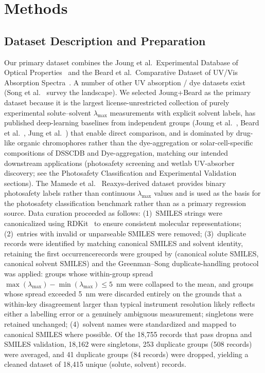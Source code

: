 \documentclass[journal=jcisd8,manuscript=article]{achemso}
\newcommand{\added}[1]{{\color{addedblue}#1}}
\newcommand{\removed}[1]{{\color{removedred}#1}}
\begin{document}
\section{Methods}
\label{sec:methods}

\subsection{Dataset Description and Preparation}
\label{sec:dataset}

Our primary dataset combines the Joung et al.\ Experimental Database of Optical Properties~\cite{joung2020experimental} and the Beard et al.\ Comparative Dataset of UV/Vis Absorption Spectra~\cite{beard2019comparative}.
\added{A number of other UV absorption / dye datasets exist (Song et al.~\cite{song2025fluortools} survey the landscape). We selected Joung+Beard as the primary dataset because it is the largest license-unrestricted collection of purely experimental solute--solvent $\lambda_{\max}$ measurements with explicit solvent labels, has published deep-learning baselines from independent groups (Joung et al.~\cite{joung2021deep}, Beard et al.~\cite{beard2019comparative}, Jung et al.~\cite{jung2024machine}) that enable direct comparison, and is dominated by drug-like organic chromophores rather than the dye-aggregation or solar-cell-specific compositions of DSSCDB and Dye-aggregation, matching our intended downstream applications (photosafety screening and wetlab UV-absorber discovery; see the Photosafety Classification and Experimental Validation sections). The Mamede et al.~\cite{mamede2021machine} Reaxys-derived dataset provides binary photosafety labels rather than continuous $\lambda_{\max}$ values and is used as the basis for the photosafety classification benchmark rather than as a primary regression source.}
Data curation proceeded as follows: (1)~SMILES strings were canonicalized using RDKit~\cite{landrumRdkitRdkit2020_03_12020} to ensure consistent molecular representations; (2)~entries with invalid or unparseable SMILES were removed; (3)~\removed{duplicate records were identified by matching canonical SMILES and solvent identity, retaining the first occurrence}\added{records were grouped by (canonical solute SMILES, canonical solvent SMILES) and the Greenman--Song duplicate-handling protocol~\cite{greenman2022multifidelity,song2025fluortools} was applied: groups whose within-group spread $\max(\lambda_{\max}) - \min(\lambda_{\max}) \leq 5$~nm were collapsed to the mean, and groups whose spread exceeded 5~nm were discarded entirely on the grounds that a within-key disagreement larger than typical instrument resolution likely reflects either a labelling error or a genuinely ambiguous measurement; singletons were retained unchanged}; (4)~solvent names were standardized and mapped to canonical SMILES where possible.\added{ Of the 18{,}755 records that pass dropna and SMILES validation, 18{,}162 were singletons, 253 duplicate groups (508 records) were averaged, and 41 duplicate groups (84 records) were dropped, yielding a cleaned dataset of 18{,}415 unique (solute, solvent) records.}
\end{document}
